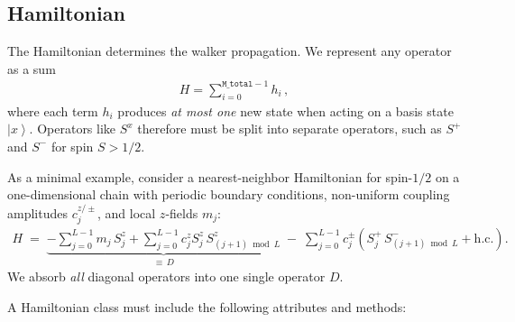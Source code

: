 \documentclass{SciPost}
\providecommand{\ket}[1]{\left|#1\right\rangle}
\begin{document}
\subsection{Hamiltonian}\label{sec:pkg:hamiltonian}
The Hamiltonian determines the walker propagation.
%
We represent any operator as a sum
\begin{align}
	H = \sum_{i=0}^{\texttt{M\_total} - 1} h_i\,,\label{eq:H}
\end{align}
where each term $h_i$ produces \emph{at most one} new state when acting on a basis state $\ket{x}$.
%
Operators like $S^x$ therefore must be split into separate operators, such as $S^+$ and $S^-$ for spin $S > 1/2$.

As a minimal example, consider a nearest-neighbor Hamiltonian for spin-$1/2$ on a one-dimensional chain with periodic boundary conditions, non-uniform coupling amplitudes $c_j^{z/\pm}$, and local $z$-fields $m_j$:
\begin{align}
	H \;=\; \underbrace{-\sum_{j=0}^{L-1} m_j\, S_j^z + \sum_{j=0}^{L-1}c_j^z
	S^z_{j}\, S^z_{(j+1) \bmod L}}_{\equiv\, D}
	\;-\; \sum_{j=0}^{L-1} c_j^\pm \left(
		S^+_{j}\, S^-_{(j+1) \bmod L} + \text{h.c.}\right).
	\label{eq:H_example}
\end{align}
We absorb \emph{all} diagonal operators into one single operator $D$.

A Hamiltonian class must include the following attributes and methods:
\end{document}
